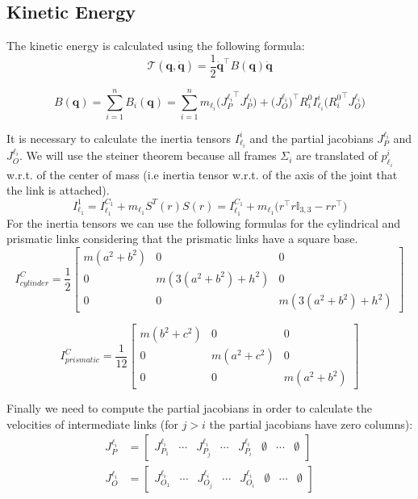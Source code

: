 \documentclass[a4paper,12pt]{article}
\renewcommand*{\l}{\ell}
\newcommand*{\T}{^\top}
\newcommand*{\I}{\mathbb{I}}
\newcommand*{\q}{\bm{q}}
\newcommand*{\dotq}{\dot{\q}}
\begin{document}
\subsection{Kinetic Energy}
The kinetic energy is calculated using the following formula:
\[
\mathcal{T}(\q,\dotq) = \frac{1}{2}\dotq\T B(\q) \dotq
\]

\[
B(\q) = \sum_{i=1}^{n} B_i(\q)
      = \sum_{i=1}^{n} m_{\l_i} \bigl({J^{\l_i}_{P}}\T J^{\l_i}_{P}\bigr)
       +  \bigl(J^{\l_i}_{O}\bigr)\T{R_i^0} I_{\l_i}^{i} \bigl({R_i^0}\T J^{\l_i}_{O}\bigr)
\]

\noindent It is necessary to calculate the inertia tensors $I_{\l_i}^{i}$ and the partial jacobians $J^{\l_i}_{P}$ and $J^{\l_i}_{O}$. We will use the steiner theorem because all frames $\Sigma_i$ are translated of $p_{\l_i}^{i}$ w.r.t. of the center of mass (i.e inertia tensor w.r.t. of the axis of the joint that the
link is attached).
\[
    I_{\l_1}^{1} = I_{\l_1}^{C_1} + m_{\l_1}S^{T}(r)S(r) = I_{\l_1}^{C_1}  +  m_{\l_1}\bigl(r\T r \I_{3,3}  -  r r\T\bigr) 
\]
For the inertia tensors we can use the following formulas for the cylindrical and prismatic links considering that the prismatic links have a square base.
\[
    I^C_{cylinder} = \frac{1}{2}\begin{bmatrix}
        m(a^2+b^2) & 0 &0 \\
        0 &m(3(a^2+b^2)+h^2)& 0 \\
        0& 0& m(3(a^2+b^2)+h^2)
    \end{bmatrix}
\]

\[
    I^C_{prismatic} = \frac{1}{12}\begin{bmatrix}
        m(b^2+c^2) & 0 &0 \\
        0 &m(a^2+c^2)& 0 \\
        0& 0& m(a^2+b^2)
    \end{bmatrix}
\]

\bigskip
\noindent Finally we need to compute the partial jacobians in order to calculate the velocities of intermediate links (for $j > i$ the partial jacobians have zero columns):
\begin{align*}
    J^{\l_i}_P &= \begin{bmatrix}
        J^{\l_i}_{P_1} & \cdots & J^{\l_i}_{P_j} & \cdots & J^{\l_i}_{P_i} & \emptyset & \cdots & \emptyset
    \end{bmatrix} \\
    J^{\l_i}_O &= \begin{bmatrix}
        J^{\l_i}_{O_1} & \cdots & J^{\l_i}_{O_j} & \cdots & J^{\l_i}_{O_i} & \emptyset & \cdots & \emptyset
    \end{bmatrix}
\end{align*}
\end{document}
